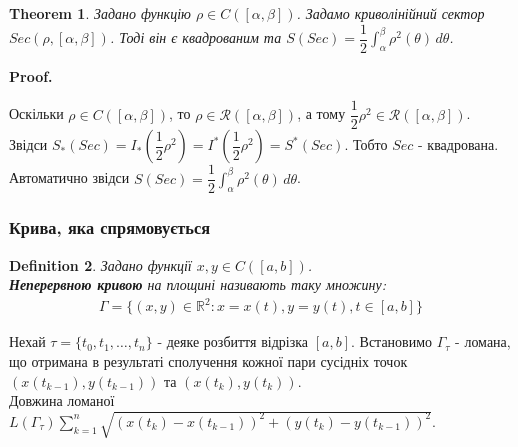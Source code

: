 \documentclass[a4paper, 10pt]{article}
\makeatletter
\def\huge{\displaystyle}
\def\qed{$\blacksquare$}
\theoremstyle{theoremdd}
\newtheorem{theorem}{Theorem}[subsection]
\theoremstyle{theoremdd}
\theoremstyle{theoremdd}
\newtheorem{definition}[theorem]{Definition}
\theoremstyle{theoremdd}
\theoremstyle{theoremdd}
\theoremstyle{theoremdd}
\theoremstyle{theoremdd}
\theoremstyle{theoremdd}
\theoremstyle{theoremdd}
\renewenvironment{proof}[1][Proof.\\]{\par
\pushQED{\hfill \qed}%
\normalfont \topsep6\p@\@plus6\p@\relax
\trivlist
\item\relax
{\bfseries
#1\@addpunct{.}}\hspace\labelsep\ignorespaces
}{%
\popQED\endtrivlist\@endpefalse
}
\makeatother
\begin{document}
\begin{theorem}
Задано функцію $\rho \in C([\alpha,\beta])$. Задамо криволінійний сектор $Sec(\rho, [\alpha,\beta])$. Тоді він є квадрованим та $S(Sec) = \dfrac{1}{2} \huge\int_\alpha^\beta \rho^2(\theta) \,d\theta$.
\end{theorem}

\begin{proof}
Оскільки $\rho \in C([\alpha,\beta])$, то $\rho \in \mathcal{R}([\alpha,\beta])$, а тому $\dfrac{1}{2}\rho^2 \in \mathcal{R}([\alpha,\beta])$. Звідси $S_*(Sec) = I_*\left( \dfrac{1}{2} \rho^2 \right) = I^*\left( \dfrac{1}{2} \rho^2 \right) = S^*(Sec)$. Тобто $Sec$ - квадрована.\\
Автоматично звідси $S(Sec) = \dfrac{1}{2} \huge\int_\alpha^\beta \rho^2(\theta) \, d\theta$.
\end{proof}

\subsubsection{Крива, яка спрямовується}
\begin{definition}
Задано функції $x,y \in C([a,b])$.\\
\textbf{Неперервною кривою} на площині називають таку множину:
\begin{align*}
\Gamma = \{ (x,y) \in \mathbb{R}^2 : x = x(t), y = y(t), t \in [a,b] \}
\end{align*}
\end{definition}
Нехай $\tau = \{t_0,t_1,\dots,t_n\}$ - деяке розбиття відрізка $[a,b]$. Встановимо $\Gamma_\tau$ - ломана, що отримана в результаті сполучення кожної пари сусідніх точок $(x(t_{k-1}), y(t_{k-1}))$ та $(x(t_{k}),y(t_{k}))$.\\
Довжина ломаної $L(\Gamma_\tau) \huge\sum_{k=1}^n \sqrt{(x(t_{k})-x(t_{k-1}))^2 + (y(t_{k})-y(t_{k-1}))^2}$.
\begin{figure}[H]
\centering
{}
\end{figure}
\end{document}
